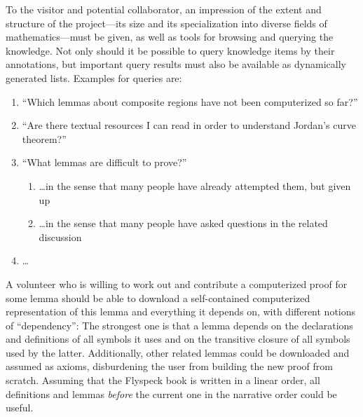 To the visitor and potential collaborator, an impression of the extent and
structure of the project---its size and its specialization into diverse fields
of mathematics---must be given, as well as tools for browsing and querying the
knowledge.  Not only should it be possible to query knowledge items by their
annotations, but important query results must also be available as dynamically
generated lists.  Examples for queries are:

\begin{enumerate}
\item\label{item:proven-lemma} ``Which lemmas about composite regions have not
  been computerized so far?''
\item ``Are there textual resources I can read in order to understand Jordan's
  curve theorem?''
\item ``What lemmas are difficult to prove?''
  \begin{enumerate}
  \item \ldots in the sense that many people have already attempted them, but given up
  \item\label{item:question-count} \ldots in the sense that many people have asked
    questions in the related discussion
  \end{enumerate}
\item \ldots{}
\end{enumerate}

A volunteer who is willing to work out and contribute a computerized proof for
some lemma should be able to download a self-contained computerized
representation of this lemma and everything it depends on, with different
notions of ``dependency'': The strongest one is that a lemma depends on the
declarations and definitions of all symbols it uses and on the transitive
closure of all symbols used by the latter.  Additionally, other related lemmas
could be downloaded and assumed as axioms, disburdening the user from building
the new proof from scratch.  Assuming that the Flyspeck book is written in a
linear order, all definitions and lemmas \emph{before} the current one in the
narrative order could be useful.

